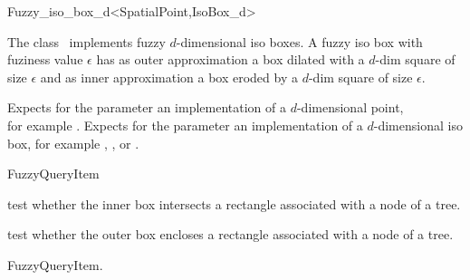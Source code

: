 

\begin{ccRefClass}{Fuzzy_iso_box_d<SpatialPoint,IsoBox_d>}  %


\ccDefinition
  
The class \ccRefName\ implements fuzzy $d$-dimensional iso boxes.
A fuzzy iso box with fuziness value $\epsilon$ has
as outer approximation a box  dilated with a $d$-dim square of size $\epsilon$ and
as inner approximation a box eroded by a $d$-dim square of size $\epsilon$. 


\ccParameters
Expects for the parameter  an implementation of a $d$-dimensional point,\\
for example .
Expects for the parameter  an implementation of a $d$-dimensional iso box,
for example , , or
.
 
\ccIsModel

FuzzyQueryItem

\ccTypes


\ccCreation
{}  %



\ccOperations


{test whether the inner box intersects a rectangle
associated with a node of a tree.}

{test whether the outer box encloses a rectangle
associated with a node of a tree.}

\ccSeeAlso

FuzzyQueryItem.




\end{ccRefClass}



